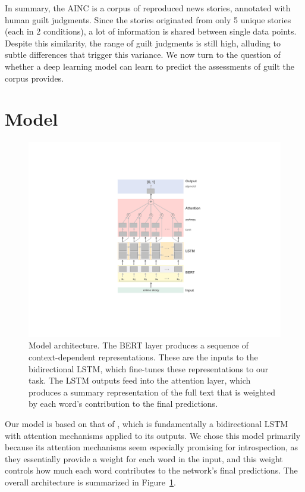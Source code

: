 \documentclass[11pt,a4paper]{article}
\begin{document}
In summary, the AINC is a corpus of reproduced news stories, annotated with human guilt judgments. Since the stories originated from only 5 unique stories (each in 2 conditions), a lot of information is shared between single data points.  Despite this similarity, the range of guilt judgments is still high, alluding to subtle differences that trigger this variance. We now turn to the question of whether a deep learning model can learn to predict the assessments of guilt the corpus provides.


\section{Model}\label{model-architecture}

\begin{figure}[tp]
  \includegraphics[width=1\linewidth]{graphs/model.pdf}
  \caption{Model architecture. The BERT layer produces
    a sequence of context-dependent representations. These
    are the inputs to the bidirectional LSTM, which
    fine-tunes these representations to our task.
    The LSTM outputs feed into the attention layer,
    which produces a summary representation of the full
    text that is weighted by each word's contribution
    to the final predictions.}
  \label{fig:model}
\end{figure}

Our model is based on that of \citet{Lin:2017}, which is fundamentally a  bidirectional LSTM with attention mechanisms applied to its outputs. We chose this model primarily because its attention mechanisms seem especially promising for introspection, as they essentially provide a weight for each word in the input, and this weight controls how much each word contributes to the network's final predictions. The overall architecture is summarized in Figure~\ref{fig:model}.
\end{document}

